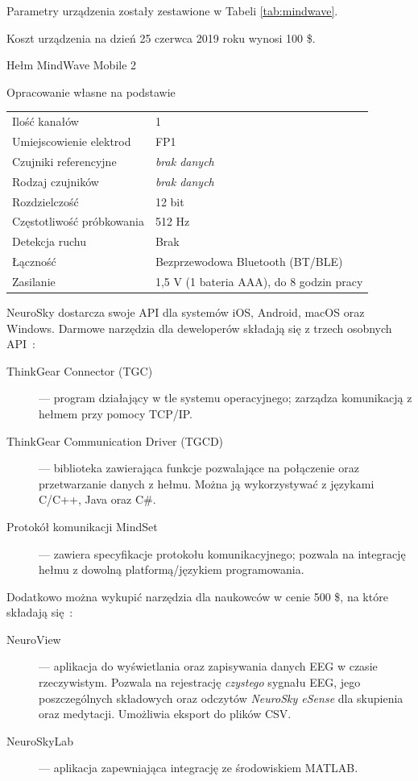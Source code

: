 \documentclass[skorowidz,skroty]{dyplomWEZUT}
\begin{document}
Parametry urządzenia zostały zestawione w Tabeli \vref{tab:mindwave}.

Koszt urządzenia na dzień 25 czerwca 2019 roku wynosi 100 \$.

{Hełm MindWave Mobile 2\label{fig:mindwave}}
{\cite{mindwave}}

{Opracowanie własne na podstawie~\cite{mindwave}}
{
    \begin{tabular}{l|l}
        Ilość kanałów & 1\\
        Umiejscowienie elektrod & FP1\\
        Czujniki referencyjne & \textit{brak danych}\\
        Rodzaj czujników & \textit{brak danych}\\
        Rozdzielczość & 12 bit\\
        Częstotliwość próbkowania & 512 Hz\\
        Detekcja ruchu & Brak\\
        Łączność & Bezprzewodowa Bluetooth (BT/BLE)\\
        Zasilanie & 1,5 V (1 bateria AAA), do 8 godzin pracy
    \end{tabular}
}

NeuroSky dostarcza swoje API dla systemów iOS, Android, macOS oraz Windows. Darmowe narzędzia dla deweloperów składają się z trzech osobnych API~\cite{mindwave_software}:

\begin{description}
    \item [ThinkGear Connector (TGC)] --- program działający w tle systemu operacyjnego; zarządza komunikacją z hełmem przy pomocy TCP/IP.
    \item [ThinkGear Communication Driver (TGCD)] --- biblioteka zawierająca funkcje pozwalające na połączenie oraz przetwarzanie danych z hełmu. Można ją wykorzystywać z językami C/C++, Java oraz C\#.
    \item [Protokół komunikacji MindSet] --- zawiera specyfikacje protokołu komunikacyjnego; pozwala na integrację hełmu z dowolną platformą/językiem programowania.
\end{description}

Dodatkowo można wykupić narzędzia dla naukowców w cenie 500 \$, na które składają się~\cite{mindwave_research}:

\begin{description}
    \item [NeuroView] --- aplikacja do wyświetlania oraz zapisywania danych EEG w czasie rzeczywistym. Pozwala na rejestrację \textit{czystego} sygnału EEG, jego poszczególnych składowych oraz odczytów \textit{NeuroSky eSense} dla skupienia oraz medytacji. Umożliwia eksport do plików CSV.
    \item [NeuroSkyLab] --- aplikacja zapewniająca integrację ze środowiskiem MATLAB.
\end{description}
\end{document}
